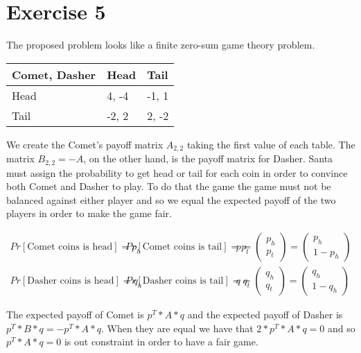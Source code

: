 \documentclass[paper=a4, fontsize=11pt]{scrartcl} %
\numberwithin{equation}{section} %
\numberwithin{figure}{section} %
\numberwithin{table}{section} %
\begin{document}
\section{Exercise 5}

The proposed problem looks like a finite zero-sum game theory problem.

\begin{center}
    \begin{tabular}{ | l | l | l | }
        \hline
        Comet, Dasher & Head & Tail \\ \hline
        Head & 4, -4 & -1, 1 \\ \hline
        Tail & -2, 2 & 2, -2 \\ \hline
    \end{tabular}
\end{center}

We create the Comet's payoff matrix $A_{2,2}$ taking the first value of each table. The matrix $B_{2,2} = -A$, on the other hand, is the payoff matrix for Dasher.
Santa must assign the probability to get head or tail for each coin in order to convince both Comet and Dasher to play.
To do that the game the game must not be balanced against either player and so we equal the expected payoff of the two players in order to make the game fair.

\[
\begin{array}{lll}
    Pr[\text{Comet coins is head}] = p_h & Pr[\text{Comet coins is tail}] = p_t & p = \begin{pmatrix} p_h \\ p_t \end{pmatrix} = \begin{pmatrix} p_h \\ 1 - p_h \end{pmatrix} \\
    Pr[\text{Dasher coins is head}] = q_h & Pr[\text{Dasher coins is tail}] = q_t & q = \begin{pmatrix} q_h \\ q_t \end{pmatrix} = \begin{pmatrix} q_h \\ 1 - q_h \end{pmatrix} 
\end{array}
\]

The expected payoff of Comet is $p^T*A*q$ and the expected payoff of Dasher is $p^T*B*q = -p^T*A*q$. When they are equal we have that $2*p^T*A*q=0$ and so $p^T*A*q=0$ is out constraint in order to have a fair game.
\end{document}
